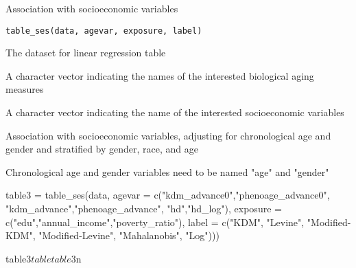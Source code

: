 \documentclass[a4paper]{book}
\begin{document}
%
\begin{Description}\relax
Association with socioeconomic variables
\end{Description}
%
\begin{Usage}
\begin{verbatim}
table_ses(data, agevar, exposure, label)
\end{verbatim}
\end{Usage}
%
\begin{Arguments}
\begin{ldescription}
\item[\code{data}] The dataset for linear regression table

\item[\code{agevar}] A character vector indicating the names of the interested biological aging measures

\item[\code{exposure}] A character vector indicating the name of the interested socioeconomic variables
\end{ldescription}
\end{Arguments}
%
\begin{Details}\relax
Association with socioeconomic variables, adjusting for chronological age and gender and stratified by gender, race, and age
\end{Details}
%
\begin{Note}\relax
Chronological age and gender variables need to be named "age" and "gender"
\end{Note}
%
\begin{Examples}
\begin{ExampleCode}
table3 = table_ses(data,
                   agevar = c("kdm_advance0","phenoage_advance0",
                               "kdm_advance","phenoage_advance",
                               "hd","hd_log"),
                   exposure = c("edu","annual_income","poverty_ratio"),
                   label = c("KDM\nBiological\nAge",
                             "Levine\nPhenotypic\nAge",
                             "Modified-KDM\nBiological\nAge",
                             "Modified-Levine\nPhenotypic\nAge",
                             "Mahalanobis\nDistance",
                             "Log\nMahalanobis\nDistance")))

table3$table
table3$n

\end{ExampleCode}
\end{Examples}
%
\end{document}
